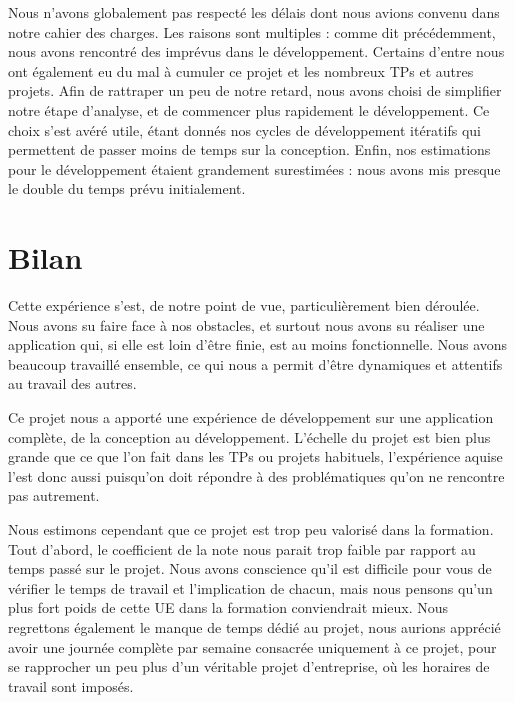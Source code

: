 \documentclass[a4paper,10pt]{report}
\begin{document}
    Nous n'avons globalement pas respecté les délais dont nous avions convenu dans notre cahier des charges. Les raisons sont multiples : comme dit précédemment, nous avons rencontré des imprévus dans le développement. Certains d'entre nous ont également eu du mal à cumuler ce projet et les nombreux TPs et autres projets. Afin de rattraper un peu de notre retard, nous avons choisi de simplifier notre étape d'analyse, et de commencer plus rapidement le développement. Ce choix s'est avéré utile, étant donnés nos cycles de développement itératifs qui permettent de passer moins de temps sur la conception. Enfin, nos estimations pour le développement étaient grandement surestimées : nous avons mis presque le double du temps prévu initialement. 

  \chapter{Bilan}

  Cette expérience s'est, de notre point de vue, particulièrement bien déroulée. Nous avons su faire face à nos obstacles, et surtout nous avons su réaliser une application qui, si elle est loin d'être finie, est au moins fonctionnelle. Nous avons beaucoup travaillé ensemble, ce qui nous a permit d'être dynamiques et attentifs au travail des autres. 

  Ce projet nous a apporté une expérience de développement sur une application complète, de la conception au développement. L'échelle du projet est bien plus grande que ce que l'on fait dans les TPs ou projets habituels, l'expérience aquise l'est donc aussi puisqu'on doit répondre à des problématiques qu'on ne rencontre pas autrement. 

  Nous estimons cependant que ce projet est trop peu valorisé dans la formation. Tout d'abord, le coefficient de la note nous parait trop faible par rapport au temps passé sur le projet. Nous avons conscience qu'il est difficile pour vous de vérifier le temps de travail et l'implication de chacun, mais nous pensons qu'un plus fort poids de cette UE dans la formation conviendrait mieux. Nous regrettons également le manque de temps dédié au projet, nous aurions apprécié avoir une journée complète par semaine consacrée uniquement à ce projet, pour se rapprocher un peu plus d'un véritable projet d'entreprise, où les horaires de travail sont imposés. 
\end{document}
